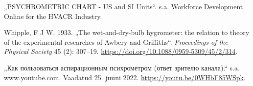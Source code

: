 \documentclass[
  12pt,
  a4paper,
  onecolumn, twoside]{article}
\newlength{\cslhangindent}
\newlength{\cslentryspacingunit} %
\newenvironment{CSLReferences}[2] %
 {%
  \setlength{\parindent}{0pt}
  \ifodd #1
  \let\oldpar\par
  \def\par{\hangindent=\cslhangindent\oldpar}
  \fi
  \setlength{\parskip}{#2\cslentryspacingunit}
 }%
 {}
\begin{document}
\begin{CSLReferences}{1}{0}
\leavevmode{}%
{„PSYCHROMETRIC CHART - US and SI Units``}. s.a. Workforce Development Online for the HVACR Industry.

\leavevmode{}%
Whipple, F J W. 1933. {„The wet-and-dry-bulb hygrometer: the relation to theory of the experimental researches of Awbery and Griffiths``}. \emph{Proceedings of the Physical Society} 45 (2): 307--19. \url{https://doi.org/10.1088/0959-5309/45/2/314}.

\leavevmode{}%
{„Как пользоваться аспирационным психрометром (ответ зрителю канала).``} s.a. www.youtube.com. Vaadatud 25. juuni 2022. \url{https://youtu.be/0WHbF85WSpk}.

\end{CSLReferences}
\end{document}
